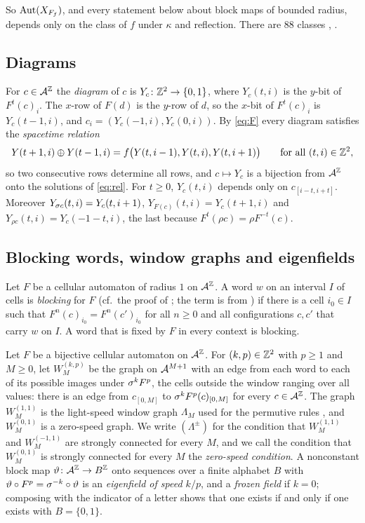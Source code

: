 So $\operatorname{Aut}(X_{F_f})$, and every statement below about block maps of bounded radius, depends only on the class of $f$ under $\kappa$ and reflection. There are $88$ classes \cite{Takesue1987}, \cite[Table~I]{Takesue1989}.

\subsection{Diagrams}
For $c\in\mathcal{A}^{\mathbb{Z}}$ the \emph{diagram} of $c$ is $Y_c\colon\mathbb{Z}^2\to\{0,1\}$, where $Y_c(t,i)$ is the $y$-bit of $F^t(c)_i$. The $x$-row of $F(d)$ is the $y$-row of $d$, so the $x$-bit of $F^t(c)_i$ is $Y_c(t-1,i)$, and $c_i=(Y_c(-1,i),Y_c(0,i))$. By \eqref{eq:F} every diagram satisfies the \emph{spacetime relation}
\begin{equation}\label{eq:rel}
Y(t+1,i)\oplus Y(t-1,i)=f\bigl(Y(t,i-1),Y(t,i),Y(t,i+1)\bigr)\qquad\text{for all }(t,i)\in\mathbb{Z}^2,
\end{equation}
so two consecutive rows determine all rows, and $c\mapsto Y_c$ is a bijection from $\mathcal{A}^{\mathbb{Z}}$ onto the solutions of \eqref{eq:rel}. For $t\ge0$, $Y_c(t,i)$ depends only on $c_{[i-t,i+t]}$. Moreover $Y_{\sigma c}(t,i)=Y_c(t,i+1)$, $Y_{F(c)}(t,i)=Y_c(t+1,i)$ and $Y_{\rho c}(t,i)=Y_c(-1-t,i)$, the last because $F^t(\rho c)=\rho F^{-t}(c)$.

\subsection{Blocking words, window graphs and eigenfields}\label{sec:blocking}
Let $F$ be a cellular automaton of radius $1$ on $\mathcal{A}^{\mathbb{Z}}$. A word $w$ on an interval $I$ of cells is \emph{blocking} for $F$ (cf.\ the proof of \cite[Theorem~3]{Kurka1997}; the term is from \cite{BT2000}) if there is a cell $i_0\in I$ such that $F^n(c)_{i_0}=F^n(c')_{i_0}$ for all $n\ge0$ and all configurations $c,c'$ that carry $w$ on $I$. A word that is fixed by $F$ in every context is blocking.

Let $F$ be a bijective cellular automaton on $\mathcal{A}^{\mathbb{Z}}$. For $(k,p)\in\mathbb{Z}^2$ with $p\ge1$ and $M\ge0$, let $W^{(k,p)}_M$ be the graph on $\mathcal{A}^{M+1}$ with an edge from each word to each of its possible images under $\sigma^kF^p$, the cells outside the window ranging over all values: there is an edge from $c_{[0,M]}$ to $\sigma^kF^p(c)_{[0,M]}$ for every $c\in\mathcal{A}^{\mathbb{Z}}$. The graph $W^{(1,1)}_M$ is the light-speed window graph $\Lambda_M$ used for the permutive rules \cite{PaperB}, and $W^{(0,1)}_M$ is a zero-speed graph. We write $(\Lambda^{\pm})$ for the condition that $W^{(1,1)}_M$ and $W^{(-1,1)}_M$ are strongly connected for every $M$, and we call the condition that $W^{(0,1)}_M$ is strongly connected for every $M$ the \emph{zero-speed condition}. A nonconstant block map $\vartheta\colon\mathcal{A}^{\mathbb{Z}}\to B^{\mathbb{Z}}$ onto sequences over a finite alphabet $B$ with $\vartheta\circ F^p=\sigma^{-k}\circ\vartheta$ is an \emph{eigenfield of speed $k/p$}, and a \emph{frozen field} if $k=0$; composing with the indicator of a letter shows that one exists if and only if one exists with $B=\{0,1\}$.


